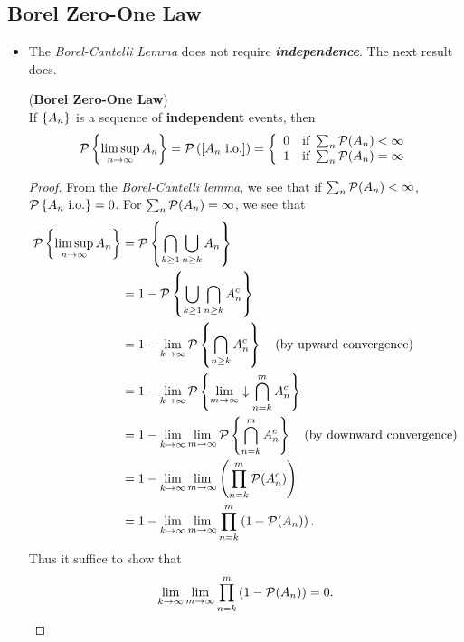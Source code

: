 \documentclass[11pt]{article}
\begin{document}
\subsection{Borel Zero-One Law}
\begin{itemize}
\item The \emph{Borel-Cantelli Lemma} does not require \textbf{\emph{independence}}. The next result does.
 \begin{theorem} (\textbf{Borel Zero-One Law}) \citep{resnick2013probability}\\
If $\left\{A_{n}\right\}$ is a sequence of \textbf{independent} events, then 
\begin{align*}
{\mathcal P}\left\{ \limsup\limits_{n\rightarrow\infty} A_{n} \right\}={\mathcal P}\left(\left[A_{n} \text{ i.o.}\right]\right) = \left\{\begin{array}{cc}
0 & \text{if } \sum_{n}{\mathcal P}(A_{n})<\infty\\ 
1 & \text{if } \sum_{n}{\mathcal P}(A_{n})=\infty
\end{array}  \right.
\end{align*}
\end{theorem}
\begin{proof}
From the \emph{Borel-Cantelli lemma}, we see that if $\sum_{n}{\mathcal P}(A_{n})<\infty$, ${\mathcal P}\left\{A_{n} \text{ i.o.}\right\}=0$. For $\sum_{n}{\mathcal P}(A_{n})=\infty$, we see that
\begin{align*}
{\mathcal P}\left\{ \limsup\limits_{n\rightarrow\infty} A_{n} \right\}&= {\mathcal P}\left\{ \bigcap_{k\ge 1}\bigcup_{n\ge k}A_{n}  \right\}\\
&=1- {\mathcal P}\left\{ \bigcup_{k\ge 1}\bigcap_{n\ge k}A^{c}_{n}  \right\}\\
&= 1- \lim\limits_{k\rightarrow \infty}{\mathcal P}\left\{\bigcap_{n\ge k}A^{c}_{n}  \right\} \quad (\text{by upward convergence})\\
&= 1- \lim\limits_{k\rightarrow \infty}{\mathcal P}\left\{\lim\limits_{m\rightarrow\infty}\downarrow\bigcap_{n=k}^{m}A^{c}_{n}  \right\}\\
&= 1- \lim\limits_{k\rightarrow \infty}\lim\limits_{m\rightarrow \infty}{\mathcal P}\left\{\bigcap_{n=k}^{m}A^{c}_{n}  \right\}  \quad (\text{by downward convergence})\\
&= 1- \lim\limits_{k\rightarrow \infty}\lim\limits_{m\rightarrow \infty}\left(\prod_{n=k}^{m}{\mathcal P}(A_{n}^{c})\right)\\
&= 1- \lim\limits_{k\rightarrow \infty}\lim\limits_{m\rightarrow \infty}\prod_{n=k}^{m}\left(1-{\mathcal P}(A_{n})\right).
\end{align*}
Thus it suffice to show that
\begin{align*}
\lim\limits_{k\rightarrow \infty}\lim\limits_{m\rightarrow \infty}\prod_{n=k}^{m}\paren{1-\cP(A_{n})} = 0.

\end{align*}
\end{proof}
\end{itemize}
\end{document}
